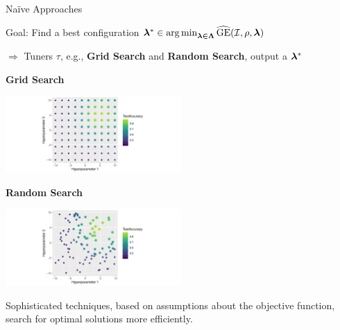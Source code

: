 \documentclass[11pt,compress,t,notes=noshow, xcolor=table]{beamer}
\begin{document}
\begin{vbframe}{Naïve Approaches}

Goal: Find a best configuration $\bm{\lambda}^{*} \in \operatorname{arg\,min} \limits_{\boldsymbol{\lambda \in \bm{\Lambda}}} \widehat{\mathrm{GE}}(\mathcal{I}, \rho, \bm{\lambda}) $

$\Rightarrow$ Tuners $\tau$, e.g., \textbf{Grid Search} and \textbf{Random Search}, output a $\bm{\lambda}^{*}$

\vspace{2em}

\begin{minipage}{0.51\textwidth}
\begin{center}
\textbf{Grid Search}
\end{center}

\includegraphics[width=190pt]{figure/cart_tuning_balgos_1.pdf}
\end{minipage}
\begin{minipage}{0.48\textwidth}
\begin{center}
\textbf{Random Search}
\end{center}

\includegraphics[width=190pt]{figure/cart_tuning_balgos_2.pdf}
\end{minipage}

\vspace{4em}
\small Sophisticated techniques, based on assumptions about the objective function, search for optimal solutions more efficiently.
\end{vbframe}
\end{document}
